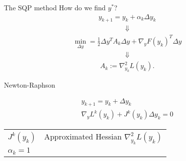 \begin{frame}{The SQP method}
How do we find $y^*$?
\begin{align*}
  y_{k+1} = y_{k} + \alpha_{k} \Delta y_{k}
\end{align*}
\begin{align*}
\Downarrow
\end{align*}
\begin{align*}
\min_{\Delta y} = \frac{1}{2} \Delta y^T A_k \Delta y + \nabla_y F(y_k)^T \Delta y
\end{align*}
\begin{align*}
\Downarrow
\end{align*}
\begin{align*}
A_{k} := \nabla^{2}_{y_k} L(y_k).
\end{align*}
  
\end{frame}

\begin{frame}{Newton-Raphson}
\begin{block}{}
\begin{gather*}
y_{k+1} = y_k + \Delta y_k \\
\nabla_{y} L^{k}(y_{k}) + J^{k}(y_{k}) \Delta y_{k} = 0
\end{gather*}
\end{block}
\begin{tabular}{l l}
  $J^k(y_k)$ & Approximated Hessian $\nabla^{2}_{y_k} L(y_k)$ \\
  $\alpha_k = 1$ & 
\end{tabular}
\end{frame}

